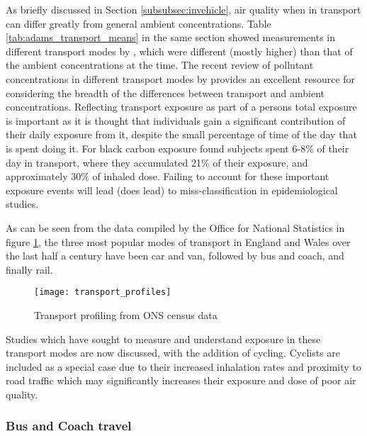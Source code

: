 As briefly discussed in Section \ref{subsubsec:invehicle}, air quality when in transport can differ greatly from general ambient concentrations. Table \ref{tab:adams_transport_means} in the same section showed measurements in different transport modes by \cite{Adams2001}, which were different (mostly higher) than that of the ambient concentrations at the time. The recent review of pollutant concentrations in different transport modes by \cite{Karanasiou2014} provides an excellent resource for considering the breadth of the differences between transport and ambient concentrations. Reflecting transport exposure as part of a persons total exposure is important as it is thought that individuals gain a significant contribution of their daily exposure from it, despite the small percentage of time of the day that is spent doing it. For black carbon exposure \cite{Dons2011} found subjects spent 6-8\% of  their day in transport, where they accumulated 21\% of their exposure, and approximately 30\% of inhaled dose. Failing to account for these important exposure events will lead (does lead) to miss-classification in epidemiological studies. 

As can be seen from the data compiled by the Office for National Statistics in figure \ref{fig:transportprofiles}, the three most popular modes of transport in England and Wales over the last half a century have been car and van, followed by bus and coach, and finally rail. 

\begin{figure}[H]
\centering
\texttt{[image: transport\_profiles]}
\caption{Transport profiling from ONS census data}
\label{fig:transportprofiles}
\end{figure}

Studies which have sought to measure and understand exposure in these transport modes are now discussed, with the addition of cycling. Cyclists are included as a special case due to their increased inhalation rates and proximity to road traffic which may significantly increases their exposure and dose of poor air quality.



\subsubsection{Bus and Coach travel}
\label{sec:bus_and_coach}

